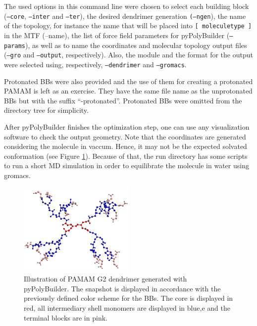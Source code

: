 The used options in this command line were chosen to select each building block (\texttt{--core}, \texttt{--inter} and \texttt{--ter}), the desired dendrimer generation \texttt{(--ngen}), the name of the topology, for instance the name that will be placed into \texttt{[ moleculetype ]} in the MTF 
(--name), the list of force field parameters for pyPolyBuilder (\texttt{--params}), as well as to name the coordinates and molecular topology output files (\texttt{--gro} and \texttt{--output}, respectively).
Also, the module and the format for the output were selected using, respectively, \texttt{--dendrimer} and \texttt{--gromacs}.

Protonated BBs were also provided and the use of them for creating a protonated PAMAM is left as an exercise.
They have the same file name as the unprotonated BBs but with the suffix ``-protonated''.
Protonated BBs were omitted from the directory tree for simplicity.

After pyPolyBuilder finishes the optimization step, one can use any visualization software to check the output geometry. 
Note that the coordinates are generated considering the molecule in vaccum.
Hence, it may not be the expected solvated conformation (see Figure \ref{fig:PAMAMG2PPB}).
Because of that, the run directory has some scripts to run a short MD simulation in order to equilibrate the molecule in water using gromacs.

\begin{figure}
    \centering
    \includegraphics[width=0.5\textwidth]{PAMAM/PAMAM.pdf}
    \caption{Illustration of PAMAM G2 dendrimer generated with pyPolyBuilder.
    The snapshot is displayed in accordance with the previously defined color scheme for the BBs. The core is displayed in red, all intermediary shell monomers are displayed in blue,e and the terminal blocks are in pink.}
    \label{fig:PAMAMG2PPB}
\end{figure}

